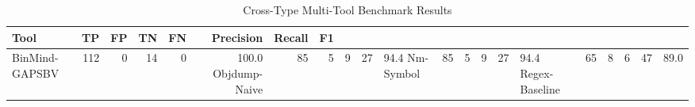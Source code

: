 \begin{table}[htbp]
\centering
\caption{Cross-Type Multi-Tool Benchmark Results}\label{tab:cross}
\begin{tabular}{lrrrrrrr}
\toprule
Tool & TP & FP & TN & FN & Precision & Recall & F1 \\
\midrule
BinMind-GAPSBV & 112 & 0 & 14 & 0 & 100.0%
Objdump-Naive & 85 & 5 & 9 & 27 & 94.4%
Nm-Symbol & 85 & 5 & 9 & 27 & 94.4%
Regex-Baseline & 65 & 8 & 6 & 47 & 89.0%
\bottomrule
\end{tabular}
\end{table}
